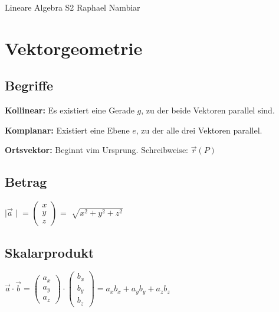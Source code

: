 



\begin{multicols*}{3}

    \DocumentInfo
    {Lineare Algebra S2} %
    {Raphael Nambiar} %

    \WhiteSpace

    \section{Vektorgeometrie}
    \subsection{Begriffe}

    \textbf{Kollinear:} Es existiert eine Gerade $g$, zu der beide Vektoren parallel sind.

    \textbf{Komplanar:} Existiert eine Ebene $e$, zu der alle drei Vektoren parallel.

    \textbf{Ortsvektor:} Beginnt vim Ursprung. Schreibweise: $\vec{r}(P) $

    \subsection{Betrag}

    $\mid \vec{a} \mid  $ =
    $\begin{pmatrix}
            x \\
            y \\
            z
        \end{pmatrix}$ = $ \sqrt[]{x^2+y^2+z^2}$
    \WhiteSpace
    \subsection{Skalarprodukt}

    $\vec{a} \cdot \vec{b} =  \begin{pmatrix}
            a_x \\
            a_y \\
            a_z
        \end{pmatrix} \cdot \begin{pmatrix}
            b_x \\
            b_y \\
            b_z
        \end{pmatrix} = a_xb_x+a_yb_y+a_zb_z$


\end{multicols*}
